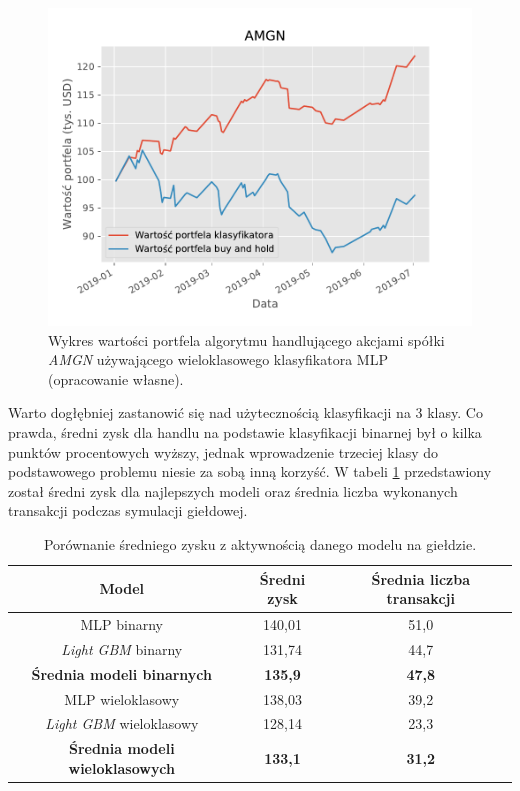 \documentclass[a4paper, twoside, 11pt, openright]{article}
\begin{document}
\begin{figure}[H]
\centering \includegraphics[scale=0.9]{img/AMGN-balance-plot.pdf}
\caption{Wykres wartości portfela algorytmu handlującego akcjami spółki \textit{AMGN} używającego wieloklasowego klasyfikatora MLP (opracowanie własne).}
\label{img:amgn_wallet_value}
\end{figure}

Warto dogłębniej zastanowić się nad użytecznością klasyfikacji na 3 klasy. Co prawda, średni zysk dla handlu na podstawie klasyfikacji binarnej był o kilka punktów procentowych wyższy, jednak wprowadzenie trzeciej klasy do podstawowego problemu niesie za sobą inną korzyść. W tabeli \ref{tab:simulation_avg_value_vs_transactions} przedstawiony został średni zysk dla najlepszych modeli oraz średnia liczba wykonanych transakcji podczas symulacji giełdowej.

 \begin{table}[H]
    \centering
    \begin{tabular}{|c|c|c|}
    \hline
        \textbf{Model}  & \textbf{Średni zysk} & \textbf{Średnia liczba transakcji}\\ \hline
            MLP binarny & 140,01 & 51,0 \\ \hline
            \textit{Light GBM} binarny & 131,74 & 44,7 \\ \hline 
            \textbf{Średnia modeli binarnych} & \textbf{135,9} & \textbf{47,8} \\ \hline \hline
            
            MLP wieloklasowy & 138,03 & 39,2 \\ \hline
            \textit{Light GBM} wieloklasowy & 128,14 & 23,3 \\ \hline
            \textbf{Średnia modeli wieloklasowych} & \textbf{133,1} & \textbf{31,2} \\ \hline
    \end{tabular}
    \caption{Porównanie średniego zysku z aktywnością danego modelu na giełdzie.}
    \label{tab:simulation_avg_value_vs_transactions}
\end{table} 
\end{document}
